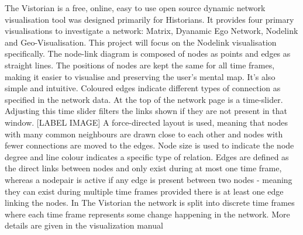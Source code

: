 The Vistorian is a free, online, easy to use open source dynamic network visualisation tool was designed primarily for Historians. It provides four primary visualisations to investigate a network: Matrix, Dyanamic Ego Network, Nodelink and Geo-Visualisation. This project will focus on the Nodelink visualisation specifically. The node-link diagram is composed of nodes as points and edges as straight lines. The positions of nodes are kept the same for all time frames, making it easier to visualise \cite{tsotaivg} and preserving the user's mental map\cite{MISSING!!!!!!!!!!!!!!!!}. It's also simple and intuitive. Coloured edges indicate different types of connection as specified in the network data.
At the top of the network page is a time-slider. Adjusting this time slider filters the links shown if they are not present in that window. [LABEL IMAGE] A force-directed layout is used, meaning that nodes with many common neighbours are drawn close to each other and nodes with fewer connections are moved to the edges. Node size is used to indicate the node degree and line colour indicates a specific type of relation. Edges are defined as the direct links between nodes and only exist during at most one time frame, whereas a nodepair is active if any edge is present between two nodes - meaning they can exist during multiple time frames provided there is at least one edge linking the nodes. In The Vistorian the network is split into discrete time frames where each time frame represents some change happening in the network.
More details are given in the visualization manual \cite{vismanual}





